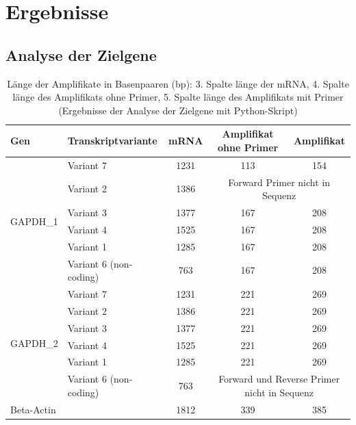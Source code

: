 \documentclass{article}
\begin{document}
\section{Ergebnisse}

\subsection*{Analyse der Zielgene}


\begin{table}[ht]
    \centering
    \begin{tabular}{|l|l|c|c|c|}
    \hline
    \textbf{Gen} & \textbf{Transkriptvariante} & \textbf{mRNA} & \textbf{Amplifikat ohne Primer} & \textbf{Amplifikat} \\ \hline
    \multirow{6}{*}{GAPDH\_1} & Variant 7 & 1231 & 113 & 154 \\ \cline{2-5} 
                              & Variant 2 & 1386 & \multicolumn{2}{c|}{Forward Primer nicht in Sequenz} \\ \cline{2-5} 
                              & Variant 3 & 1377 & 167 & 208 \\ \cline{2-5} 
                              & Variant 4 & 1525 & 167 & 208 \\ \cline{2-5} 
                              & Variant 1 & 1285 & 167 & 208 \\ \cline{2-5} 
                              & Variant 6 (non-coding) & 763 & 167 & 208 \\ \hline
    \multirow{6}{*}{GAPDH\_2} & Variant 7 & 1231 & 221 & 269 \\ \cline{2-5} 
                              & Variant 2 & 1386 & 221 & 269 \\ \cline{2-5} 
                              & Variant 3 & 1377 & 221 & 269 \\ \cline{2-5} 
                              & Variant 4 & 1525 & 221 & 269 \\ \cline{2-5} 
                              & Variant 1 & 1285 & 221 & 269 \\ \cline{2-5} 
                              & Variant 6 (non-coding) & 763 & \multicolumn{2}{c|}{Forward und Reverse Primer nicht in Sequenz} \\ \hline
    Beta-Actin               &  & 1812 & 339 & 385 \\ \hline
    \end{tabular}
    \caption{Länge der Amplifikate in Basenpaaren (bp): 3. Spalte länge der mRNA, 4. Spalte länge des Amplifikats ohne Primer, 5. Spalte länge des Amplifikats mit Primer (Ergebnisse der Analyse der Zielgene mit Python-Skript)}
    \label{table:mRNA_lengths}
    \end{table}
\end{document}
